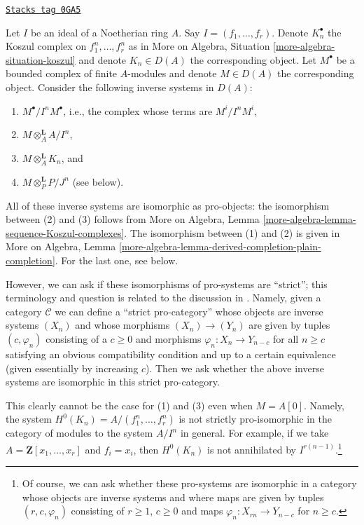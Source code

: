 \begin{remark}
\label{local-cohomology-remark-strict-pro-isomorphism}
\href{https://stacks.math.columbia.edu/tag/0GA5}{\texttt{Stacks tag 0GA5}}

Let $I$ be an ideal of a Noetherian ring $A$. Say $I = (f_1, \ldots, f_r)$.
Denote $K_n^\bullet$ the Koszul complex on $f_1^n, \ldots, f_r^n$ as in
More on Algebra, Situation \ref{more-algebra-situation-koszul} and
denote $K_n \in D(A)$ the corresponding object.
Let $M^\bullet$ be a bounded complex of finite $A$-modules
and denote $M \in D(A)$ the corresponding object.
Consider the following inverse systems in $D(A)$:
\begin{enumerate}
\item $M^\bullet/I^nM^\bullet$, i.e., the complex whose terms are $M^i/I^nM^i$,
\item $M \otimes_A^\mathbf{L} A/I^n$,
\item $M \otimes_A^\mathbf{L} K_n$, and
\item $M \otimes_P^\mathbf{L} P/J^n$ (see below).
\end{enumerate}
All of these inverse systems are isomorphic as pro-objects:
the isomorphism between (2) and (3) follows from
More on Algebra, Lemma \ref{more-algebra-lemma-sequence-Koszul-complexes}.
The isomorphism between (1) and (2) is given in
More on Algebra, Lemma
\ref{more-algebra-lemma-derived-completion-plain-completion}.
For the last one, see below.

\medskip\noindent
However, we can ask if these isomorphisms of pro-systems are ``strict'';
this terminology and question is related to the discussion in
\cite[pages 61, 62]{quillenhomology}. Namely, given a category $\mathcal{C}$
we can define a ``strict pro-category'' whose objects are inverse systems
$(X_n)$ and whose morphisms $(X_n) \to (Y_n)$ are given by tuples
$(c, \varphi_n)$ consisting of a $c \geq 0$ and morphisms
$\varphi_n : X_n \to Y_{n - c}$ for all $n \geq c$ satisfying
an obvious compatibility condition and up to a certain equivalence
(given essentially by increasing $c$). Then we ask whether the above
inverse systems are isomorphic in this strict pro-category.

\medskip\noindent
This clearly cannot be the case for (1) and (3) even when $M = A[0]$.
Namely, the system $H^0(K_n) = A/(f_1^n, \ldots, f_r^n)$ is not strictly
pro-isomorphic in the category of modules to the system $A/I^n$ in general.
For example, if we take $A = \mathbf{Z}[x_1, \ldots, x_r]$ and $f_i = x_i$,
then $H^0(K_n)$ is not annihilated by $I^{r(n - 1)}$.\footnote{Of
course, we can ask whether these pro-systems are isomorphic in
a category whose objects are inverse systems and where maps are given
by tuples $(r, c, \varphi_n)$ consisting of $r \geq 1$, $c \geq 0$
and maps $\varphi_n : X_{rn} \to Y_{n - c}$ for $n \geq c$.}


\end{remark}
